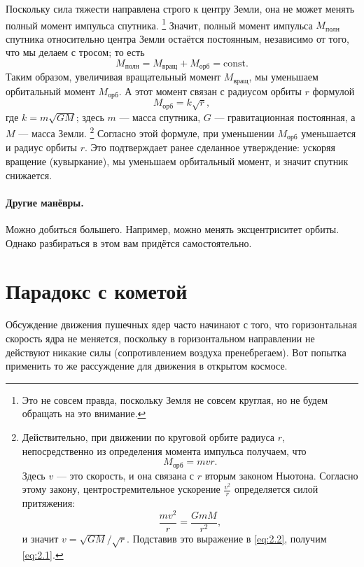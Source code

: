 Поскольку сила тяжести направлена строго к центру Земли, она не может менять полный момент импульса спутника.%
\footnote{Это не совсем правда, поскольку Земля не совсем круглая, но не будем обращать на это внимание.}
Значит, полный момент импульса $M_{\text{полн}}$ спутника относительно центра Земли остаётся постоянным, независимо от того, что мы делаем с тросом; то есть
\[
M_{\text{полн}}=M_{\text{вращ}}+M_{\text{орб}}=\mathrm{const}.
\]
Таким образом, увеличивая вращательный момент $M_{\text{вращ}}$, мы уменьшаем орбитальный момент $M_{\text{орб}}$.
А этот момент связан с радиусом орбиты $r$ формулой
\begin{equation}
M_{\text{орб}}=k \sqrt{r},
\label{eq:2.1}
\end{equation}
где $k=m \sqrt{G M}$;
здесь $m$ --- масса спутника, $G$ --- гравитационная постоянная, а $M$ --- масса Земли.%
\footnote{Действительно, при движении по круговой орбите радиуса $r$, непосредственно из определения момента импульса получаем, что
\begin{equation}
M_{\text{орб}}=m v r. \label{eq:2.2}
\end{equation}
Здесь $v$ --- это скорость, и она связана с $r$ вторым законом Ньютона.
Согласно этому закону, центростремительное ускорение $\frac{v^2}{r}$ определяется силой притяжения:
\[
\frac{m  v^2}{r}=\frac{G m M}{r^2},
\]
и значит
$v=\sqrt{G M}/\sqrt{r}$.
Подставив это выражение в \eqref{eq:2.2}, получим \eqref{eq:2.1}.}
Согласно этой формуле, при уменьшении $M_{\text{орб}}$ уменьшается и радиус орбиты $r$.
Это подтверждает ранее сделанное утверждение: ускоряя вращение (кувыркание), мы уменьшаем орбитальный момент, и значит спутник снижается.

\paragraph{Другие манёвры.}
Можно добиться большего.
Например, можно менять эксцентриситет орбиты.
Однако разбираться в этом вам придётся самостоятельно.

\section{Парадокс с кометой}\label{Парадокс с кометой}

Обсуждение движения пушечных ядер часто начинают с того, что горизонтальная скорость ядра не меняется, поскольку в горизонтальном направлении не действуют никакие силы (сопротивлением воздуха пренебрегаем).
Вот попытка применить то же рассуждение для движения в открытом космосе.

